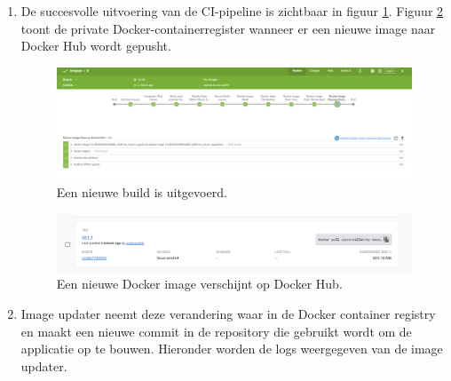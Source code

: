 \begin{enumerate}
  \item De succesvolle uitvoering van de CI-pipeline is zichtbaar in figuur \ref{fig:Cipipesuc}. Figuur \ref{fig:newdockerimage} toont de private Docker-containerregister wanneer er een nieuwe image naar Docker Hub wordt gepusht.
  \begin{figure}[H]
    \includegraphics[scale=0.35]{graphics/CIpipelineSuc.png}
  \caption{\label{fig:Cipipesuc} Een nieuwe build is uitgevoerd.}
  \end{figure}
  
  \begin{figure}[H]
    \includegraphics[scale=0.50]{graphics/newtagdockerimage.png}
  \caption{\label{fig:newdockerimage} Een nieuwe Docker image verschijnt op Docker Hub.}
  \end{figure}
  
  \item Image updater neemt deze verandering waar in de Docker container registry en maakt een nieuwe commit in de repository die gebruikt wordt om de applicatie op te bouwen. Hieronder worden de logs weergegeven van de image updater.
  \newline
  

\end{enumerate}
